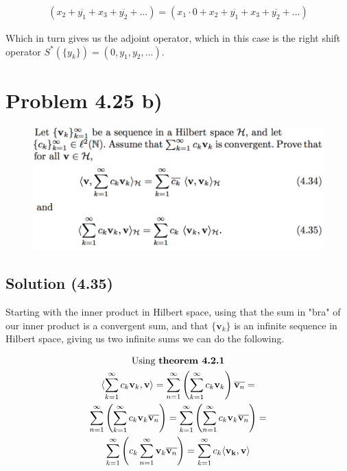 \documentclass{article}
\begin{document}
\begin{gather*}
    (x_2+\overline{y_1}+x_3+\overline{y_2}+...) = (x_1\cdot0+x_2+\overline{y_1}+x_3+\overline{y_2}+...)
\end{gather*}

Which in turn gives us the adjoint operator, which in this case is the right shift operator $S^\ast(\{y_k\})=(0,y_1,y_2,...)$.

\newpage
\section*{Problem 4.25 b)}

\begin{figure}[h!]
    \centering
    \includegraphics[width=12cm]{fig/prob425}
\end{figure}

\subsection*{Solution (4.35)}
Starting with the inner product in Hilbert space, using that the sum in "bra" of our inner product is a convergent sum, and that $\{\mathbf{v}_k \}$ is an infinite sequence in Hilbert space, giving us two infinite sums we can do the following.

\begin{gather*}
\text{Using \textbf{theorem 4.2.1}} \\
    \langle \sum_{k=1}^\infty c_k \mathbf{v}_k,\mathbf{v}\rangle = \sum_{n=1}^\infty \left( \sum_{k=1}^\infty c_k \mathbf{v}_k \right) \overline{\mathbf{v}_n} = \\
    \sum_{n=1}^\infty \left( \sum_{k=1}^\infty c_k \mathbf{v}_k \overline{\mathbf{v}_n} \right) = \sum_{k=1}^\infty \left( \sum_{n=1}^\infty c_k \mathbf{v}_k \overline{\mathbf{v}_n} \right) = \\
    \sum_{k=1}^\infty \left( c_k \sum_{n=1}^\infty \mathbf{v}_k \overline{\mathbf{v}_n} \right) = \sum_{k=1}^\infty c_k \langle \mathbf{v_k} , \mathbf{v} \rangle 
\end{gather*}
\end{document}
